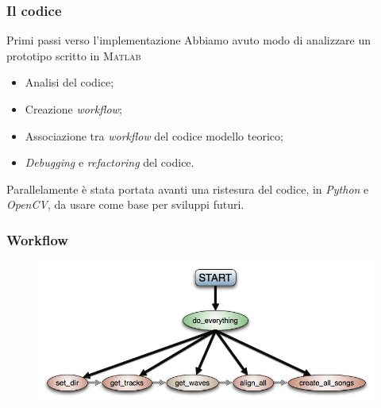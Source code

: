 \begin{frame}
\frametitle{Il codice}
\begin{block}{Primi passi verso l'implementazione}
Abbiamo avuto modo di analizzare un prototipo scritto in \textsc{Matlab}
\end{block}

\begin{block}{}
\begin{itemize}
\item Analisi del codice;
\item Creazione \emph{workflow};
\item Associazione tra \emph{workflow} del codice modello teorico;
\item \textit{Debugging} e \textit{refactoring} del codice.
\end{itemize}
\end{block}

\begin{block}{}
Parallelamente \`e stata portata avanti una ristesura del codice, in \emph{Python}
e \emph{OpenCV}, da usare come base per sviluppi futuri.
\end{block}
\end{frame}

\begin{frame}
\frametitle{Workflow}
\begin{figure}
\includegraphics[width=\textwidth]{immagini/workflow.png}
\end{figure}
\end{frame}

